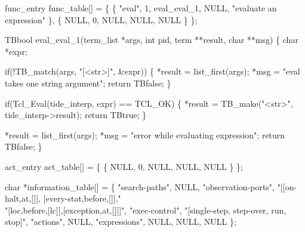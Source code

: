 func_entry func_table[] =
\{ \{ "eval", 1, eval_eval_1, NULL, "evaluate an expression" \},
  \{ NULL, 0, NULL, NULL, NULL \}
\};
\nwendcode{}\nwdocspar

\nwenddocs{}\endmoddef\let\nwnotused=\nwoutput{}
TBbool eval_eval_1(term_list *args, int pid, term **result, char **msg)
\{
  char *expr;

  if(!TB_match(args, "[<str>]", &expr)) \{
    *result = list_first(args);
    *msg = "eval takes one string argument";
    return TBfalse;
  \}

  if(Tcl_Eval(tide_interp, expr) == TCL_OK) \{
    *result = TB_make("<str>", tide_interp->result);
    return TBtrue;
  \}

  *result = list_first(args);
  *msg = "error while evaluating expression";
  return TBfalse;
\}
\nwendcode{}\nwdocspar


\nwenddocs{}\endmoddef
act_entry act_table[] =
\{ \{ NULL, 0, NULL, NULL, NULL \}
\};
\nwendcode{}\nwdocspar


\nwenddocs{}\endmoddef
char *information_table[] =
\{ "search-paths",               NULL,
  "observation-ports",          "[[on-halt,at,[]], [every-stat,before,[]]," \\
                                "[loc,before,[lc]],[exception,at,[]]]",
  "exec-control",               "[single-step, step-over, run, stop]",
  "actions",                    NULL,
  "expressions",                NULL,
  NULL,                         NULL
\};
\nwendcode{}\nwdocspar




